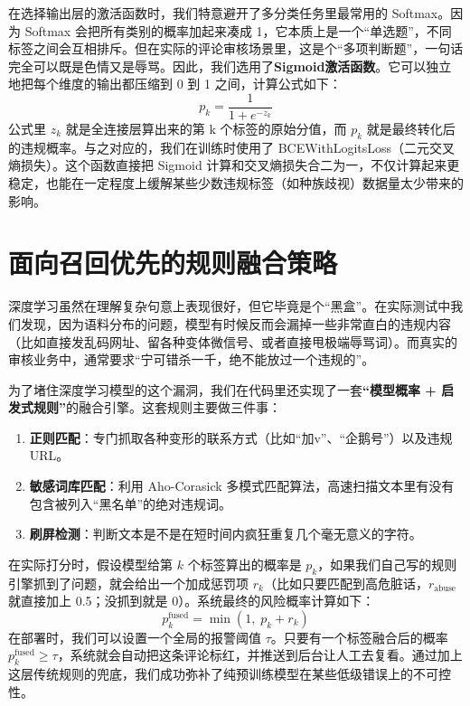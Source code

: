 \documentclass[twoside]{thesis-cls-Miya} %
\begin{document}
在选择输出层的激活函数时，我们特意避开了多分类任务里最常用的 Softmax。因为 Softmax 会把所有类别的概率加起来凑成 1，它本质上是一个“单选题”，不同标签之间会互相排斥。但在实际的评论审核场景里，这是个“多项判断题”，一句话完全可以既是色情又是辱骂。因此，我们选用了\textbf{Sigmoid激活函数}。它可以独立地把每个维度的输出都压缩到 0 到 1 之间，计算公式如下：
\begin{equation}p_k = \frac{1}{1 + e^{-z_k}}
\end{equation}
公式里 \(z_k\) 就是全连接层算出来的第 k 个标签的原始分值，而 \(p_k\) 就是最终转化后的违规概率。与之对应的，我们在训练时使用了 BCEWithLogitsLoss（二元交叉熵损失）。这个函数直接把 Sigmoid 计算和交叉熵损失合二为一，不仅计算起来更稳定，也能在一定程度上缓解某些少数违规标签（如种族歧视）数据量太少带来的影响。

\section{面向召回优先的规则融合策略}
深度学习虽然在理解复杂句意上表现很好，但它毕竟是个“黑盒”。在实际测试中我们发现，因为语料分布的问题，模型有时候反而会漏掉一些非常直白的违规内容（比如直接发乱码网址、留各种变体微信号、或者直接甩极端辱骂词）。而真实的审核业务中，通常要求“宁可错杀一千，绝不能放过一个违规的”。

为了堵住深度学习模型的这个漏洞，我们在代码里还实现了一套\textbf{“模型概率 + 启发式规则”}的融合引擎。这套规则主要做三件事：
\begin{enumerate}
	\def\labelenumi{\arabic{enumi}.}
	\item
	\textbf{正则匹配}：专门抓取各种变形的联系方式（比如“加v”、“企鹅号”）以及违规 URL。
	\item
	\textbf{敏感词库匹配}：利用 Aho-Corasick 多模式匹配算法，高速扫描文本里有没有包含被列入“黑名单”的绝对违规词。
	\item
	\textbf{刷屏检测}：判断文本是不是在短时间内疯狂重复几个毫无意义的字符。
\end{enumerate}

在实际打分时，假设模型给第 \(k\) 个标签算出的概率是 \(p_k\)，如果我们自己写的规则引擎抓到了问题，就会给出一个加成惩罚项 \(r_k\)（比如只要匹配到高危脏话，\(r_{\text{abuse}}\) 就直接加上 0.5；没抓到就是 0）。系统最终的风险概率计算如下：
\begin{equation}p_k^{\text{fused}}=\min(1,\; p_k + r_k)
\end{equation}
在部署时，我们可以设置一个全局的报警阈值 \(\tau\)。只要有一个标签融合后的概率 \(p_k^{\text{fused}} \ge \tau\)，系统就会自动把这条评论标红，并推送到后台让人工去复看。通过加上这层传统规则的兜底，我们成功弥补了纯预训练模型在某些低级错误上的不可控性。
\end{document}
